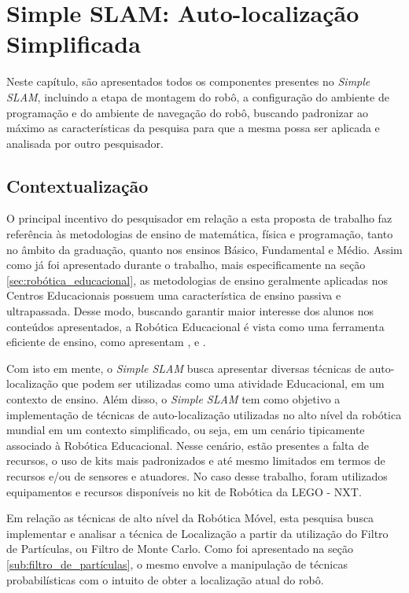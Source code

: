 \chapter[Simple SLAM]{Simple SLAM: Auto-localização Simplificada}

Neste capítulo, são apresentados todos os componentes presentes no \textit{Simple SLAM}, incluindo a etapa de montagem do robô,
a configuração do ambiente de programação e do ambiente de navegação do robô, buscando padronizar ao máximo as características da
pesquisa para que a mesma possa ser aplicada e analisada por outro pesquisador.

\section{Contextualização}
\label{sec:simple_context}

	O principal incentivo do pesquisador em relação a esta proposta de trabalho faz referência às metodologias de ensino de matemática, física e programação, tanto no âmbito da graduação, quanto nos ensinos Básico, Fundamental e Médio. Assim como já foi apresentado durante o trabalho, mais especificamente na seção \ref{sec:robótica_educacional}, as metodologias de ensino geralmente aplicadas nos Centros Educacionais possuem uma característica de ensino passiva e ultrapassada. Desse modo, buscando garantir maior interesse dos alunos nos conteúdos apresentados, a Robótica Educacional é vista como uma ferramenta eficiente de ensino, como apresentam \cite{teachingWithRoboticKit}, \cite{construcionismoPapert} e \cite{roboticaEducativaEnsinoMedio}.

	Com isto em mente, o \textit{Simple SLAM} busca apresentar diversas técnicas de auto-localização que podem ser utilizadas como uma atividade Educacional, em um contexto de ensino. Além disso, o \textit{Simple SLAM} tem como objetivo a implementação de técnicas de auto-localização utilizadas no alto nível da robótica mundial em um contexto simplificado,
	ou seja, em um cenário tipicamente associado à Robótica Educacional. Nesse cenário, estão presentes a falta de recursos, o uso de kits mais
	padronizados e até mesmo limitados em termos de recursos e/ou de sensores e atuadores. No caso desse trabalho, foram utilizados
	equipamentos e recursos disponíveis no kit de Robótica da LEGO - NXT.

  Em relação as técnicas de alto nível da Robótica Móvel, esta pesquisa busca implementar e analisar a técnica de Localização a partir da utilização
	do Filtro de Partículas, ou Filtro de Monte Carlo. Como foi apresentado na seção \ref{sub:filtro_de_partículas}, o mesmo envolve
	a manipulação de técnicas probabilísticas com o intuito de obter a localização atual do robô.

